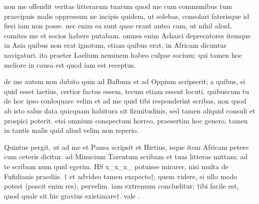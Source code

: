 


 non me offendit veritas litterarum tuarum quod me cum communibus tum praecipuis malis oppressum ne incipis quidem, ut solebas, consolari faterisque id fieri iam non posse. nec enim ea sunt quae erant antea cum, ut nihil aliud, comites me et socios habere putabam. omnes enim Achaici deprecatores itemque in Asia quibus non erat ignotum, etiam quibus erat, in Africam dicuntur navigaturi. ita praeter Laelium neminem habeo culpae socium; qui tamen hoc meliore in causa est quod iam est receptus.

 de me autem non dubito quin ad Balbum et ad Oppium scripserit; a quibus, si quid esset laetius, certior factus essem, tecum etiam essent locuti. quibuscum tu de hoc ipso conloquare velim et ad me quid tibi responderint scribas, non quod ab isto salus data quicquam habitura sit firmitudinis, sed tamen aliquid consuli et prospici poterit. etsi omnium conspectum horreo, praesertim hoc genero, tamen in tantis malis quid aliud velim non reperio.

 Quintus pergit, ut ad me et Pansa scripsit et Hirtius, isque item Africam petere cum ceteris dicitur. ad Minucium Tarentum scribam et tuas litteras mittam; ad te scribam num quid egerim. HS x_x_x_ potuisse mirarer, nisi multa de Fufidianis praediis. † et advideo tamen exspecto†; quem videre, si ullo modo potest (poscit enim res), pervelim. iam extremum concluditur; †ibi facile est, quod quale sit hic gravius existimare†. vale .
